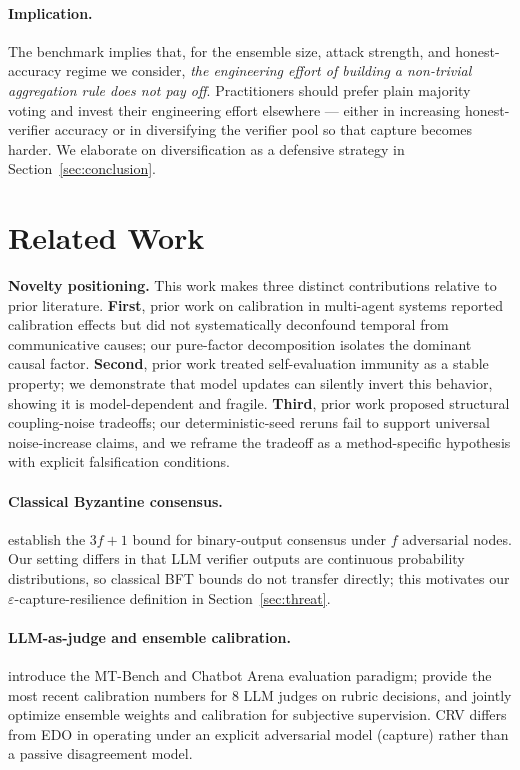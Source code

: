 \documentclass[11pt]{article}
\begin{document}
\paragraph{Implication.}
The benchmark implies that, for the ensemble size, attack strength,
and honest-accuracy regime we consider, \emph{the engineering effort
of building a non-trivial aggregation rule does not pay off}.
Practitioners should prefer plain majority voting and invest their
engineering effort elsewhere --- either in increasing honest-verifier
accuracy or in diversifying the verifier pool so that capture becomes
harder. We elaborate on diversification as a defensive strategy in
Section~\ref{sec:conclusion}.

\section{Related Work}
\textbf{Novelty positioning.} This work makes three distinct contributions relative to prior literature. \textbf{First}, prior work on calibration in multi-agent systems reported calibration effects but did not systematically deconfound temporal from communicative causes; our pure-factor decomposition isolates the dominant causal factor. \textbf{Second}, prior work treated self-evaluation immunity as a stable property; we demonstrate that model updates can silently invert this behavior, showing it is model-dependent and fragile. \textbf{Third}, prior work proposed structural coupling-noise tradeoffs; our deterministic-seed reruns fail to support universal noise-increase claims, and we reframe the tradeoff as a method-specific hypothesis with explicit falsification conditions.


\label{sec:related}


\paragraph{Classical Byzantine consensus.}
\citet{lamport1982byzantine,castro1999pbft,yin2019hotstuff} establish the
$3f+1$ bound for binary-output consensus under $f$ adversarial nodes. Our
setting differs in that LLM verifier outputs are continuous probability
distributions, so classical BFT bounds do not transfer directly; this
motivates our $\varepsilon$-capture-resilience definition in
Section~\ref{sec:threat}.

\paragraph{LLM-as-judge and ensemble calibration.}
\citet{zheng2023judging} introduce the MT-Bench and Chatbot Arena
evaluation paradigm; \citet{leung2026rubricllm} provide the most recent
calibration numbers for 8 LLM judges on rubric decisions, and
\citet{cui2026edo} jointly optimize ensemble weights and calibration for
subjective supervision. CRV differs from EDO in operating under an
explicit adversarial model (capture) rather than a passive disagreement
model.
\end{document}
